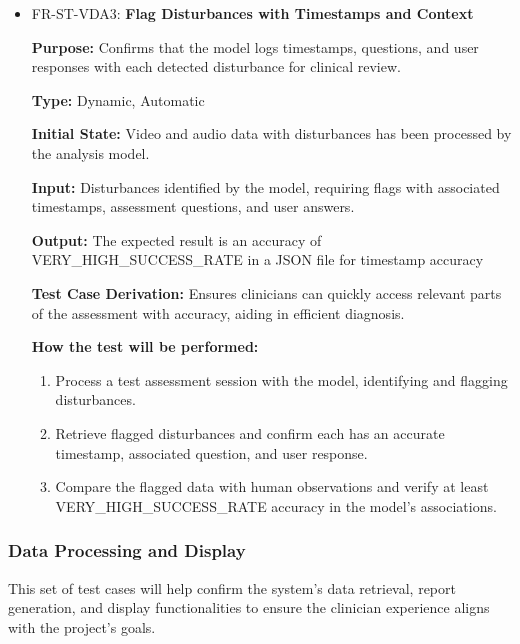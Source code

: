 \documentclass[12pt, titlepage]{article}
\begin{document}
\begin{itemize}
  \item FR-ST-VDA3: \textbf{Flag Disturbances with Timestamps and Context}
  \begin{mdframed}[linewidth=0.5mm]
      \textbf{Purpose:} Confirms that the model logs timestamps, questions, and user responses with each detected disturbance for clinical review. \par
      \textbf{Type:} Dynamic, Automatic \par
      \textbf{Initial State:} Video and audio data with disturbances has been processed by the analysis model. \par
      \textbf{Input:} Disturbances identified by the model, requiring flags with associated timestamps, assessment questions, and user answers. \par
      \textbf{Output:} The expected result is an accuracy of VERY\_HIGH\_SUCCESS\_RATE in a JSON file for timestamp accuracy \par
      \textbf{Test Case Derivation:} Ensures clinicians can quickly access relevant parts of the assessment with accuracy, aiding in efficient diagnosis. \par
      \textbf{How the test will be performed:}
      \begin{enumerate}[noitemsep]
        \item Process a test assessment session with the model, identifying and flagging disturbances.
        \item Retrieve flagged disturbances and confirm each has an accurate timestamp, associated question, and user response.
        \item Compare the flagged data with human observations and verify at least \\ VERY\_HIGH\_SUCCESS\_RATE accuracy in the model’s associations.
      \end{enumerate}
  \end{mdframed}
\end{itemize}

\subsubsection{Data Processing and Display}

\hspace{2em}This set of test cases will help confirm the system's data retrieval, report generation, 
and display functionalities to ensure the clinician experience aligns with the project’s goals.
\end{document}
